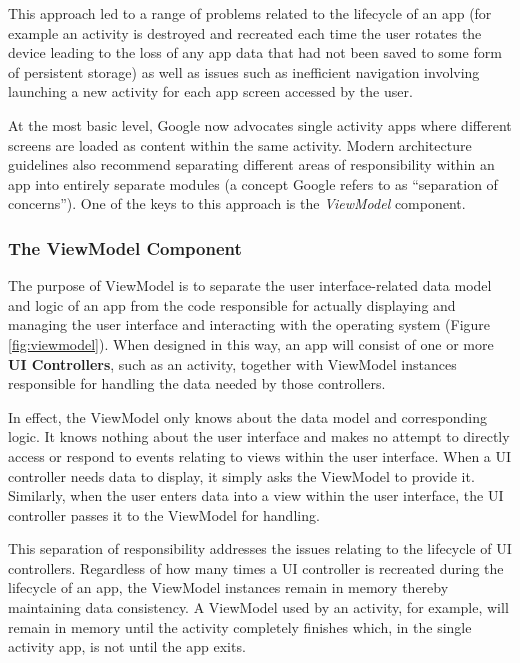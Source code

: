 This approach led to a range of problems related to the lifecycle of an app (for example an activity is destroyed and recreated each time the user rotates the device leading to the loss of any app data that had not been saved to some form of persistent storage) as well as issues such as inefficient navigation involving launching a new activity for each app screen accessed by the user.

At the most basic level, Google now advocates single activity apps where different screens are loaded as content within the same activity. Modern architecture guidelines also recommend separating different areas of responsibility within an app into entirely separate modules (a concept Google refers to as “separation of concerns”). One of the keys to this approach is the \textit{ViewModel} component.

\subsubsection{The ViewModel Component}
The purpose of ViewModel is to separate the user interface-related data model and logic of an app from the code responsible for actually displaying and managing the user interface and interacting with the operating system (Figure \ref{fig:viewmodel}). When designed in this way, an app will consist of one or more \textbf{UI Controllers}, such as an activity, together with ViewModel instances responsible for handling the data needed by those controllers.

In effect, the ViewModel only knows about the data model and corresponding logic. It knows nothing about the user interface and makes no attempt to directly access or respond to events relating to views within the user interface. When a UI controller needs data to display, it simply asks the ViewModel to provide it. Similarly, when the user enters data into a view within the user interface, the UI controller passes it to the ViewModel for handling.

This separation of responsibility addresses the issues relating to the lifecycle of UI controllers. Regardless of how many times a UI controller is recreated during the lifecycle of an app, the ViewModel instances remain in memory thereby maintaining data consistency. A ViewModel used by an activity, for example, will remain in memory until the activity completely finishes which, in the single activity app, is not until the app exits.

